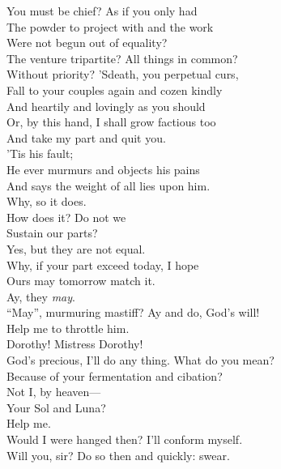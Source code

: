 \documentclass[a4paper,oneside,12pt]{memoir}
\begin{document}
\begin{drama*}
You must be chief? As if you only had\\
The powder to project with and the work\\
Were not begun out of equality?\\
The venture tripartite? All things in common?\\
Without priority? 'Sdeath, you perpetual curs,\\
Fall to your couples again and cozen kindly\\
And heartily and lovingly as you should\\
Or, by this hand, I shall grow factious too\\
And take my part and quit you.\\
\facespeaks {} 'Tis his fault;\\
He ever murmurs and objects his pains\\
And says the weight of all lies upon him.\\
\subtlespeaks Why, so it does.\\
\dolspeaks {} How does it? Do not we\\
Sustain our parts?\\
\subtlespeaks {} Yes, but they are not equal.\\
\dolspeaks Why, if your part exceed today, I hope\\
Ours may tomorrow match it.\\
\subtlespeaks {} Ay, they \emph{may}.\\
\dolspeaks ``May'', murmuring mastiff? Ay and do, God's will!\\
Help me to throttle him.\\
\subtlespeaks {} Dorothy! Mistress Dorothy!\\
God's precious, I'll do any thing. What do you mean?\\
\dolspeaks Because of your fermentation and cibation?\\
\subtlespeaks Not I, by heaven---\\
\dolspeaks {} Your Sol and Luna?\\
 Help me.\\
\subtlespeaks Would I were hanged then? I'll conform myself.\\
\dolspeaks Will you, sir? Do so then and quickly: swear.\\

\end{drama*}
\end{document}
